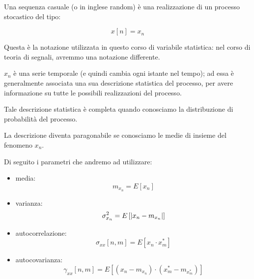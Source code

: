 Una sequenza casuale (o in inglese random) è una realizzazione di un processo stocastico del tipo: 

{
    \Large 
    \begin{equation}
        x \left[ n\right] = x_{n}
    \end{equation}
}

\begin{tcolorbox}
    Questa è la notazione utilizzata in questo corso di variabile statistica: nel corso di teoria di segnali, avremmo una notazione differente. 
\end{tcolorbox}

$x_{n}$ è una serie temporale (e quindi cambia ogni istante nel tempo); 
ad essa è generalmente associata una sua descrizione statistica del processo, per avere informazione su tutte le possibili realizzazioni del processo. \newline 

Tale descrizione statistica è completa quando conosciamo la distribuzione di probabilità del processo. \newline 

La descrizione diventa paragonabile se conosciamo le medie di insieme del fenomeno $x_{n}$. \newline 

Di seguito i parametri che andremo ad utilizzare: 

\begin{itemize}
    \item media: 
    {
        \Large 
        \begin{equation}
            m_{x_{n}} = E \left[ x_{n}\right]
        \end{equation}
    }
    \item varianza: 
    {
        \Large 
        \begin{equation}
            \sigma_{x_{n}}^{2} = E \left[ \abs{x_{n} - m_{x_{n}}}\right]
        \end{equation}
    }
    \item autocorrelazione: 
    {
        \Large 
        \begin{equation}
            \sigma_{xx} \left[ n, m\right] = E \left[x_{n} \cdot x_{m}^{*}\right]
        \end{equation}
    } 
    \item autocovarianza: 
    {
        \Large 
        \begin{equation}
            \gamma_{xx} \left[ n, m\right] = E \left[ \left(x_{n} - m_{x_{n}}\right) \cdot \left(x_{m}^{*} - m_{x_{m}^{*}}\right)\right]
        \end{equation}
    }
\end{itemize}


